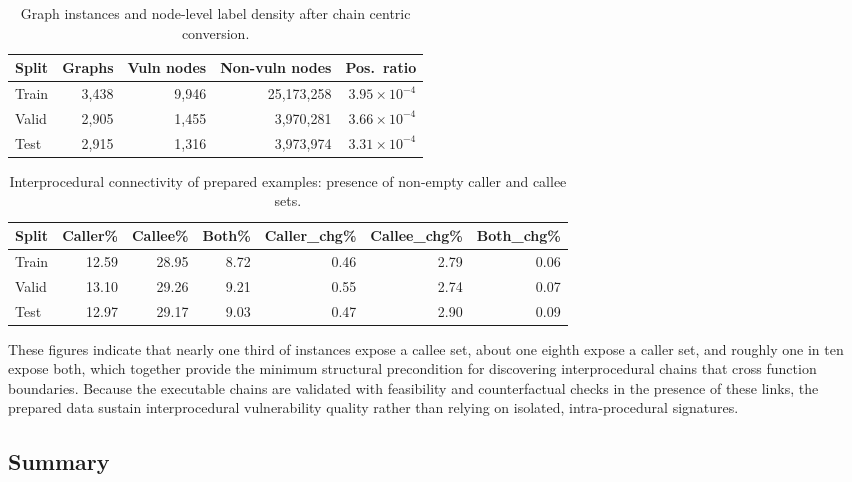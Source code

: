 \documentclass{buthesis}
\begin{document}
\begin{table}[H]
\centering
\caption{Graph instances and node-level label density after chain centric conversion.}
\label{tab:graph-density}
\begin{tabular}{lrrrr}
\toprule
\textbf{Split} & \textbf{Graphs} & \textbf{Vuln nodes} & \textbf{Non-vuln nodes} & \textbf{Pos.\ ratio} \\
\midrule
Train & 3{,}438 & 9{,}946 & 25{,}173{,}258 & $3.95\times10^{-4}$ \\
Valid & 2{,}905 & 1{,}455 & 3{,}970{,}281 & $3.66\times10^{-4}$ \\
Test  & 2{,}915 & 1{,}316 & 3{,}973{,}974 & $3.31\times10^{-4}$ \\
\bottomrule
\end{tabular}
\end{table}

\begin{table}[H]
\centering
\caption{Interprocedural connectivity of prepared examples: presence of non-empty caller and callee sets.}
\label{tab:ipa-coverage}
\begin{tabular}{lrrrrrr}
\toprule
\textbf{Split} & \textbf{Caller\%} & \textbf{Callee\%} & \textbf{Both\%} & \textbf{Caller\_chg\%} & \textbf{Callee\_chg\%} & \textbf{Both\_chg\%} \\
\midrule
Train & 12.59 & 28.95 & 8.72 & 0.46 & 2.79 & 0.06 \\
Valid & 13.10 & 29.26 & 9.21 & 0.55 & 2.74 & 0.07 \\
Test  & 12.97 & 29.17 & 9.03 & 0.47 & 2.90 & 0.09 \\
\bottomrule
\end{tabular}
\end{table}

These figures indicate that nearly one third of instances expose a callee set, about one eighth expose a caller set, and roughly one in ten expose both, which together provide the minimum structural precondition for discovering interprocedural chains that cross function boundaries. Because the executable chains are validated with feasibility and counterfactual checks in the presence of these links, the prepared data sustain interprocedural vulnerability quality rather than relying on isolated, intra-procedural signatures.

\subsection{Summary}
\label{subsec:dataset-summary}
\end{document}
